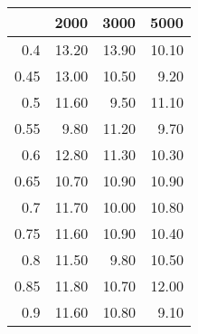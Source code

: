 \begin{table}[ht]
\centering
\begin{tabular}{rrrr}
  \hline
 & 2000 & 3000 & 5000 \\ 
  \hline
0.4 & 13.20 & 13.90 & 10.10 \\ 
  0.45 & 13.00 & 10.50 & 9.20 \\ 
  0.5 & 11.60 & 9.50 & 11.10 \\ 
  0.55 & 9.80 & 11.20 & 9.70 \\ 
  0.6 & 12.80 & 11.30 & 10.30 \\ 
  0.65 & 10.70 & 10.90 & 10.90 \\ 
  0.7 & 11.70 & 10.00 & 10.80 \\ 
  0.75 & 11.60 & 10.90 & 10.40 \\ 
  0.8 & 11.50 & 9.80 & 10.50 \\ 
  0.85 & 11.80 & 10.70 & 12.00 \\ 
  0.9 & 11.60 & 10.80 & 9.10 \\ 
   \hline
\end{tabular}
\end{table}
